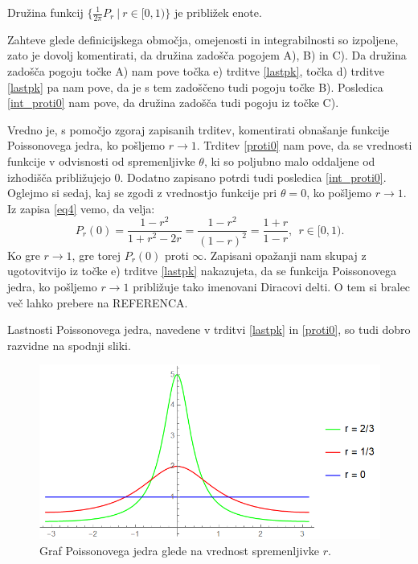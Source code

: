 \documentclass[mat1]{fmfdelo}
\begin{document}
    \begin{trditev}
        Družina funkcij $\{ \frac{1}{2 \pi} P_r~|~r \in [0,1)\}$ je približek enote.
    \end{trditev}
    \begin{dokaz}
        Zahteve glede definicijskega območja, omejenosti in integrabilnosti so izpoljene, zato je dovolj komentirati, da družina zadošča pogojem A), B) in C). 
        Da družina zadošča pogoju točke A) nam pove točka e) trditve \ref{lastpk}, točka d) trditve \ref{lastpk} pa nam pove, da je s tem zadoščeno tudi pogoju točke B). 
        Posledica \ref{int_proti0} nam pove, da družina zadošča tudi pogoju iz točke C).
    \end{dokaz}
    \begin{opomba}
        Vredno je, s pomočjo zgoraj zapisanih trditev, komentirati obnašanje funkcije Poissonovega jedra, ko pošljemo $r \to 1$. Trditev \ref{proti0} nam pove, da se vrednosti funkcije v odvisnosti od spremenljivke $\theta$, ki so poljubno malo oddaljene od izhodišča približujejo $0$. Dodatno zapisano potrdi tudi posledica \ref{int_proti0}.
        Oglejmo si sedaj, kaj se zgodi z vrednostjo funkcije pri $\theta = 0$, ko pošljemo $r \to 1$. Iz zapisa \eqref{eq4} vemo, da velja:
        $$
        P_r(0) = \frac{1-r^2}{1+ r^2 - 2r} = \frac{1- r^2}{(1 - r)^2} = \frac{1 + r}{1 -r},~~r \in [0,1).
        $$
        Ko gre $r \to 1$, gre torej $P_r(0)$ proti $\infty$. Zapisani opažanji nam skupaj z ugotovitvijo iz točke e) trditve \ref{lastpk} nakazujeta, da se funkcija Poissonovega jedra, ko pošljemo $r \to 1$ približuje tako imenovani Diracovi delti. 
        O tem si bralec več lahko prebere na REFERENCA.
    \end{opomba}

    \begin{opomba}
        Lastnosti Poissonovega jedra, navedene v trditvi \ref{lastpk} in \ref{proti0}, so tudi dobro razvidne na spodnji sliki. 
    \end{opomba}

    \begin{figure}[H]
        \begin{center}
        \includegraphics[width=\linewidth]{grafi.png}
        \caption{Graf Poissonovega jedra glede na vrednost spremenljivke $r$.}
        \end{center}    
    \end{figure}
\end{document}
